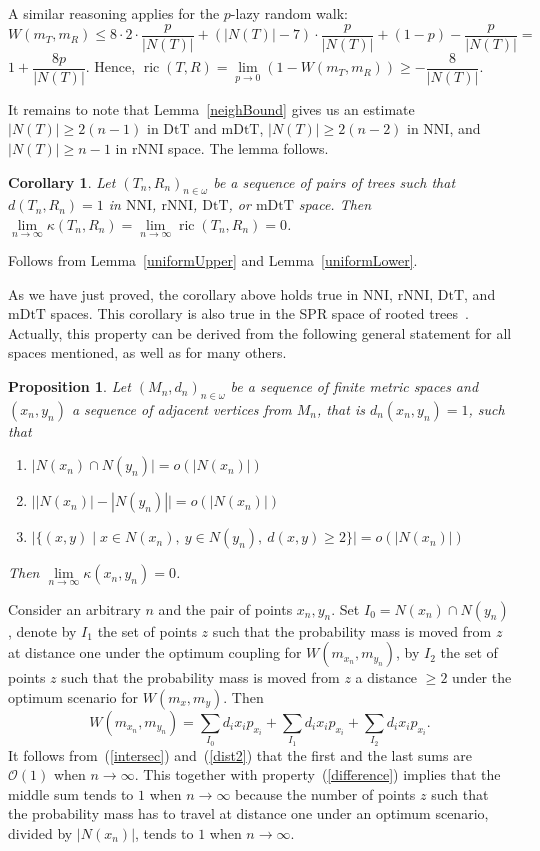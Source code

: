 \documentclass{amsart}
\newtheorem{proposition}[lemma]{Proposition}
\newtheorem{corollary}[lemma]{Corollary}
\newcommand{\dts}{\mathrm{DtT}}
\newcommand{\nni}{\mathrm{NNI}}
\newcommand{\rnni}{\mathrm{rNNI}}
\newcommand{\mdts}{\mathrm{mDtT}}
\newcommand{\ric}{\operatorname{ric}}
\renewcommand{\O}{\mathcal{O}}
\begin{document}
A similar reasoning applies for the $p$-lazy random walk:
\[
W(m_T,m_R)\leq 8 \cdot 2 \cdot \frac{p}{|N(T)|} +
(|N(T)| - 7) \cdot \frac{p}{|N(T)|} + (1-p) - \frac{p}{|N(T)|} =
\]
$1 + \dfrac{8p}{|N(T)|}$.
Hence, $\ric(T,R) = \lim\limits_{p\to0}\left(1 - W(m_T,m_R)\right) \geq - \dfrac{8}{|N(T)|}$.

It remains to note that Lemma~\ref{neighBound} gives us an estimate $|N(T)| \geq 2(n-1)$ in $\dts$ and $\mdts$, $|N(T)| \geq 2(n-2)$ in $\nni$, and $|N(T)| \geq n-1$ in $\rnni$ space.
The lemma follows.
\endproof

\begin{corollary}\label{flatInLimDTS}
Let $(T_n,R_n)_{n\in\omega}$ be a sequence of pairs of trees such that $d(T_n,R_n) = 1$ in $\nni$, $\rnni$, $\dts$, or $\mdts$ space.
Then $\lim\limits_{n \to \infty}\kappa(T_n,R_n) = \lim\limits_{n \to \infty}\ric(T_n,R_n) = 0$.
\end{corollary}

\proof
Follows from Lemma~\ref{uniformUpper} and Lemma~\ref{uniformLower}.
\endproof

As we have just proved, the corollary above holds true in $\nni$, $\rnni$, $\dts$, and $\mdts$ spaces.
This corollary is also true in the SPR space of rooted trees~\cite{Whidden2015-es}.
Actually, this property can be derived from the following general statement for all spaces mentioned, as well as for many others.

\begin{proposition}\label{flatInLimGen}
Let $(M_n,d_n)_{n \in \omega}$ be a sequence of finite metric spaces and $(x_n, y_n)$ a sequence of adjacent vertices from $M_n$, that is $d_n(x_n,y_n) = 1$, such that
\begin{enumerate}[(1)]
\item\label{intersec} $\big|N(x_n) \cap N(y_n)\big| = o(|N(x_n)|)$
\item\label{difference} $\big||N(x_n)| - |N(y_n)|\big| = o(|N(x_n)|)$
\item\label{dist2} $\big|\{(x,y) \mid
	x \in N(x_n),~ y \in N(y_n),~ d(x, y) \geq 2\}\big| = o(|N(x_n)|)$
\end{enumerate}

Then $\lim\limits_{n \to \infty} \kappa(x_n, y_n) = 0$.
\end{proposition}

\proof
Consider an arbitrary $n$ and the pair of points $x_n,y_n$.
Set $I_0 = N(x_n) \cap N(y_n)$, denote by $I_1$ the set of points $z$ such that the probability mass is moved from $z$ at distance one under the optimum coupling for $W(m_{x_n},m_{y_n})$, by $I_2$ the set of points $z$ such that the probability mass is moved from $z$ a distance $\geq 2$ under the optimum scenario for $W(m_x,m_y)$.
Then
\[
W(m_{x_n},m_{y_n}) = \sum_{I_0} d_i x_i p_{x_i} + \sum_{I_1} d_i x_i p_{x_i} +
\sum_{I_2} d_i x_i p_{x_i}.
\]
It follows from~(\ref{intersec}) and~(\ref{dist2}) that the first and the last sums are $\O(1)$ when $n\to\infty$.
This together with property~(\ref{difference}) implies that the middle sum tends to $1$ when $n\to\infty$ because the number of points $z$ such that the probability mass has to travel at distance one under an optimum scenario, divided by $|N(x_n)|$, tends to $1$ when $n\to\infty$.
\endproof
\end{document}
